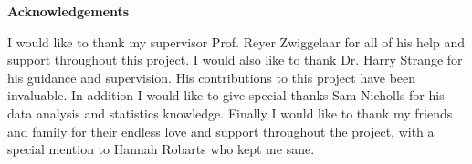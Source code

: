 \thispagestyle{empty}

\begin{center}
    {\LARGE\bf Acknowledgements}
\end{center}

I would like to thank my supervisor Prof. Reyer Zwiggelaar for all of his help and support throughout this project. I would also like to thank Dr. Harry Strange for his guidance and supervision. His contributions to this project have been invaluable. In addition I would like to give special thanks Sam Nicholls for his data analysis and statistics knowledge. Finally I would like to thank my friends and family for their endless love and support throughout the project, with a special mention to Hannah Robarts who kept me sane.
